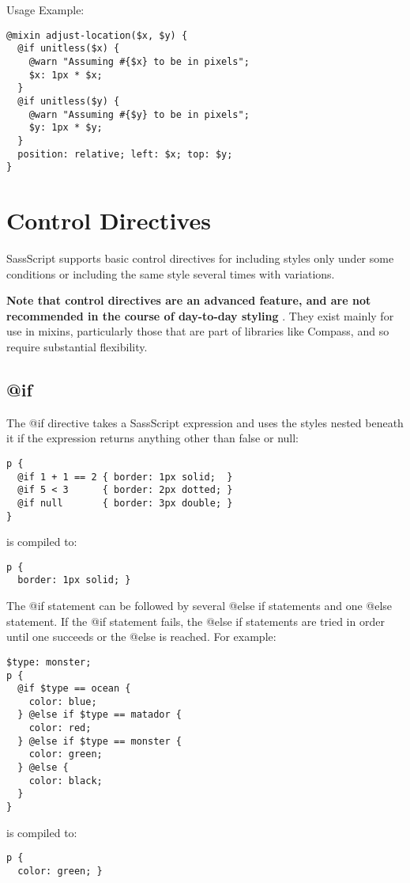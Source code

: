 \documentclass[10pt]{article}
\begin{document}
 Usage Example:
\begin{verbatim}
@mixin adjust-location($x, $y) {
  @if unitless($x) {
    @warn "Assuming #{$x} to be in pixels";
    $x: 1px * $x;
  }
  @if unitless($y) {
    @warn "Assuming #{$y} to be in pixels";
    $y: 1px * $y;
  }
  position: relative; left: $x; top: $y;
}
\end{verbatim}
\section{Control Directives}


 SassScript supports basic control directives for including styles only under some conditions or including the same style several times with variations.


 \textbf{Note that control directives are an advanced feature, and are not recommended in the course of day-to-day styling}
. They exist mainly for use in mixins, particularly those that are part of libraries like Compass, and so require substantial flexibility.
\subsection{@if}


 The @if directive takes a SassScript expression and uses the styles nested beneath it if the expression returns anything other than false or null:
\begin{verbatim}
p {
  @if 1 + 1 == 2 { border: 1px solid;  }
  @if 5 < 3      { border: 2px dotted; }
  @if null       { border: 3px double; }
}
\end{verbatim}


 is compiled to:
\begin{verbatim}
p {
  border: 1px solid; }
\end{verbatim}


 The @if statement can be followed by several @else if statements and one @else statement. If the @if statement fails, the @else if statements are tried in order until one succeeds or the @else is reached. For example:
\begin{verbatim}
$type: monster;
p {
  @if $type == ocean {
    color: blue;
  } @else if $type == matador {
    color: red;
  } @else if $type == monster {
    color: green;
  } @else {
    color: black;
  }
}
\end{verbatim}


 is compiled to:
\begin{verbatim}
p {
  color: green; }
\end{verbatim}
\end{document}
